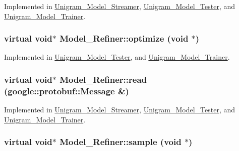 Implemented in \hyperlink{class_unigram___model___streamer_a60124013b5da9fabc486558801fa3ab4}{Unigram\_\-Model\_\-Streamer}, \hyperlink{class_unigram___model___tester_a04021ed578bfeaa08a8956fc611c2722}{Unigram\_\-Model\_\-Tester}, and \hyperlink{class_unigram___model___trainer_a8034a5fd2767a6869f87a82956e127d6}{Unigram\_\-Model\_\-Trainer}.

\hypertarget{class_model___refiner_a238a8d648f8b1c0966ea8e4cbbaa9e9e}{
\subsubsection[{optimize}]{\setlength{\rightskip}{0pt plus 5cm}virtual void$\ast$ Model\_\-Refiner::optimize (void $\ast$)}}
\label{class_model___refiner_a238a8d648f8b1c0966ea8e4cbbaa9e9e}


Implemented in \hyperlink{class_unigram___model___tester_a1f1c50061c974325ec32810e27428d08}{Unigram\_\-Model\_\-Tester}, and \hyperlink{class_unigram___model___trainer_afaf685a22d603c7a0b44ed692a928c13}{Unigram\_\-Model\_\-Trainer}.

\hypertarget{class_model___refiner_ae6b2ecaaddf8aa0876cfb42bff713607}{
\subsubsection[{read}]{\setlength{\rightskip}{0pt plus 5cm}virtual void$\ast$ Model\_\-Refiner::read (google::protobuf::Message \&)}}
\label{class_model___refiner_ae6b2ecaaddf8aa0876cfb42bff713607}


Implemented in \hyperlink{class_unigram___model___streamer_a8a092c8036f7eb09b76b200fb5524ea0}{Unigram\_\-Model\_\-Streamer}, \hyperlink{class_unigram___model___tester_a3d6b3c06e90df22b72bbd979eedef78e}{Unigram\_\-Model\_\-Tester}, and \hyperlink{class_unigram___model___trainer_af4f1230edeb83227aaeee31e9f81aeeb}{Unigram\_\-Model\_\-Trainer}.

\hypertarget{class_model___refiner_a6c2ecd4d1df247352c8319e0eb17e1e2}{
\subsubsection[{sample}]{\setlength{\rightskip}{0pt plus 5cm}virtual void$\ast$ Model\_\-Refiner::sample (void $\ast$)}}
\label{class_model___refiner_a6c2ecd4d1df247352c8319e0eb17e1e2}


